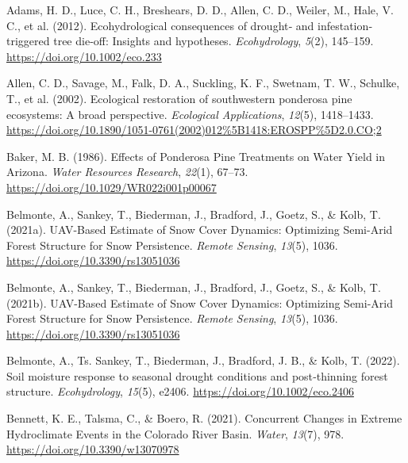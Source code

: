 \documentclass[
]{agujournal2019}
\newlength{\cslhangindent}
\newenvironment{CSLReferences}[2] %
 {\begin{list}{}{%
  \setlength{\itemindent}{0pt}
  \setlength{\leftmargin}{0pt}
  \setlength{\parsep}{0pt}
  \ifodd #1
   \setlength{\leftmargin}{\cslhangindent}
   \setlength{\itemindent}{-1\cslhangindent}
  \fi
  \setlength{\itemsep}{#2\baselineskip}}}
 {\end{list}}
\begin{document}
\label{refs}
\begin{CSLReferences}{1}{0}
\vspace{1em}

Adams, H. D., Luce, C. H., Breshears, D. D., Allen, C. D., Weiler, M.,
Hale, V. C., et al. (2012). Ecohydrological consequences of drought‐ and
infestation‐ triggered tree die‐off: Insights and hypotheses.
\emph{Ecohydrology}, \emph{5}(2), 145--159.
\url{https://doi.org/10.1002/eco.233}

Allen, C. D., Savage, M., Falk, D. A., Suckling, K. F., Swetnam, T. W.,
Schulke, T., et al. (2002). Ecological restoration of southwestern
ponderosa pine ecosystems: A broad perspective. \emph{Ecological
Applications}, \emph{12}(5), 1418--1433.
\url{https://doi.org/10.1890/1051-0761(2002)012\%5B1418:EROSPP\%5D2.0.CO;2}

Baker, M. B. (1986). Effects of {Ponderosa} {Pine} {Treatments} on
{Water} {Yield} in {Arizona}. \emph{Water Resources Research},
\emph{22}(1), 67--73. \url{https://doi.org/10.1029/WR022i001p00067}

Belmonte, A., Sankey, T., Biederman, J., Bradford, J., Goetz, S., \&
Kolb, T. (2021a). {UAV}-{Based} {Estimate} of {Snow} {Cover} {Dynamics}:
{Optimizing} {Semi}-{Arid} {Forest} {Structure} for {Snow}
{Persistence}. \emph{Remote Sensing}, \emph{13}(5), 1036.
\url{https://doi.org/10.3390/rs13051036}

Belmonte, A., Sankey, T., Biederman, J., Bradford, J., Goetz, S., \&
Kolb, T. (2021b). UAV-Based Estimate of Snow Cover Dynamics: Optimizing
Semi-Arid Forest Structure for Snow Persistence. \emph{Remote Sensing},
\emph{13}(5), 1036. \url{https://doi.org/10.3390/rs13051036}

Belmonte, A., Ts. Sankey, T., Biederman, J., Bradford, J. B., \& Kolb,
T. (2022). Soil moisture response to seasonal drought conditions and
post‐thinning forest structure. \emph{Ecohydrology}, \emph{15}(5),
e2406. \url{https://doi.org/10.1002/eco.2406}

Bennett, K. E., Talsma, C., \& Boero, R. (2021). Concurrent {Changes} in
{Extreme} {Hydroclimate} {Events} in the {Colorado} {River} {Basin}.
\emph{Water}, \emph{13}(7), 978. \url{https://doi.org/10.3390/w13070978}


\end{CSLReferences}
\end{document}
